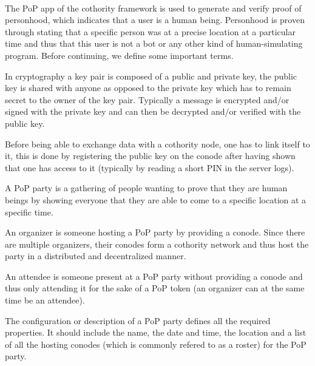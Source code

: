\paragraph{}
The PoP app of the cothority framework is used to generate and verify proof of personhood, which indicates that a user is a human being. Personhood is proven through stating that a specific person was at a precise location at a particular time and thus that this user is not a bot or any other kind of human-simulating program. Before continuing, we define some important terms.

\begin{description}[style=nextline]
\item[Key Pair] In cryptography a key pair is composed of a public and private key, the public key is shared with anyone as opposed to the private key which has to remain secret to the owner of the key pair. Typically a message is encrypted and/or signed with the private key and can then be decrypted and/or verified with the public key.

\item[Conode Linking] Before being able to exchange data with a cothority node, one has to link itself to it, this is done by registering the public key on the conode after having shown that one has access to it (typically by reading a short PIN in the server logs).

\item[PoP Party] A PoP party is a gathering of people wanting to prove that they are human beings by showing everyone that they are able to come to a specific location at a specific time.

\item[Organizer (Org)] An organizer is someone hosting a PoP party by providing a conode. Since there are multiple organizers, their conodes form a cothority network and thus host the party in a distributed and decentralized manner.

\item[Attendee (Att)] An attendee is someone present at a PoP party without providing a conode and thus only attending it for the sake of a PoP token (an organizer can at the same time be an attendee).

\item[PoP Party Configuration/Description (Config/Desc)] The configuration or description of a PoP party defines all the required properties. It should include the name, the date and time, the location and a list of all the hosting conodes (which is commonly refered to as a roster) for the PoP party.


\end{description}
